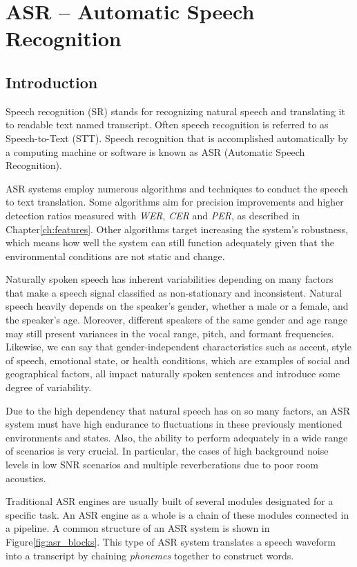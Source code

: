 \chapter{ASR -- Automatic Speech Recognition}\label{ch:asr_ch}
\section{Introduction}
Speech recognition (SR) stands for recognizing 
natural speech and translating 
it to readable text named transcript.
Often speech recognition is referred to as Speech-to-Text (STT). 
Speech recognition 
that is accomplished 
automatically by a computing machine or 
software is known as ASR (Automatic Speech Recognition).

ASR systems employ numerous algorithms 
and techniques to conduct the speech to text translation.
Some algorithms aim for precision improvements
and higher detection ratios measured with \emph{WER},
\emph{CER}
and \emph{PER},
as described in Chapter\;\ref{ch:features}.
Other algorithms target increasing
the system's robustness, which means
how well the system can still function adequately
given that the environmental conditions
are not static and change.

Naturally spoken speech has inherent 
variabilities depending on many 
factors that make a speech signal 
classified as non-stationary and inconsistent. 
Natural speech heavily depends on the speaker's gender, 
whether a male or a female, and the speaker's age. 
Moreover, different speakers of the same 
gender and age range may still present variances 
in the vocal range, pitch, and formant frequencies.
Likewise, we can say that gender-independent 
characteristics such as accent, style of speech, emotional state, 
or health conditions, 
which are examples of social and geographical factors, 
all impact naturally spoken sentences and 
introduce some degree of variability.

Due to the high dependency that natural speech has on so many factors, 
an ASR system must have high endurance to fluctuations in these 
previously mentioned environments and states. Also, the ability to perform adequately in a wide range of scenarios is very crucial.  
In particular, the cases of high background noise levels in low SNR scenarios and multiple reverberations due to poor room acoustics.

Traditional ASR engines 
are usually built of several 
modules designated for a specific task.
An ASR engine as a whole is a chain of these modules connected in a pipeline. 
A common structure of an ASR system
is shown in Figure\;\ref{fig:asr_blocks}. This type
of ASR system translates a speech waveform into a transcript
by chaining \emph{phonemes} together to construct words.

